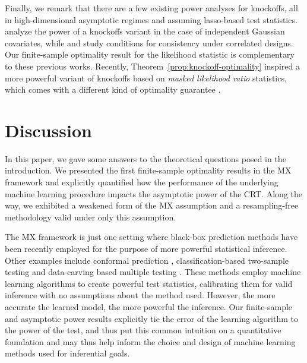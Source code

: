 \documentclass[ejs]{imsart}
\numberwithin{equation}{section}
\theoremstyle{plain}
\theoremstyle{definition}
\theoremstyle{remark}
\begin{document}
Finally, we remark that there are a few existing power analyses for knockoffs, all in high-dimensional asymptotic regimes and assuming lasso-based test statistics. \cite{Weinstein2017} analyze the power of a knockoffs variant in the case of independent Gaussian covariates, while \cite{Liu2019} and \cite{Fan2020} study conditions for consistency under correlated designs. Our finite-sample optimality result for the likelihood statistic is complementary to these previous works. Recently, Theorem~\ref{prop:knockoff-optimality} inspired a more powerful variant of knockoffs based on \textit{masked likelihood ratio} statistics, which comes with a different kind of optimality guarantee \citep{Spector2022}.


\section{Discussion}
\label{sec:discussion}

In this paper, we gave some answers to the theoretical questions posed in the introduction. We presented the first finite-sample optimality results in the MX framework and explicitly quantified how the performance of the underlying machine learning procedure impacts the asymptotic power of the CRT. Along the way, we exhibited a weakened form of the MX assumption and a resampling-free methodology valid under only this assumption.

The MX framework is just one setting where black-box prediction methods have been recently employed for the purpose of more powerful statistical inference. Other examples include conformal prediction \cite{FoygelBarber2019}, classification-based two-sample testing \citep{Kim2020} and data-carving based multiple testing \citep{lei2016adapt}. These methods employ machine learning algorithms to create powerful test statistics, calibrating them for valid inference with no assumptions about the method used. However, the more accurate the learned model, the more powerful the inference. Our finite-sample and asymptotic power results explicitly tie the error of the learning algorithm to the power of the test, and thus put this common intuition on a quantitative foundation and may thus help inform the choice and design of machine learning methods used for inferential goals. 
\end{document}
